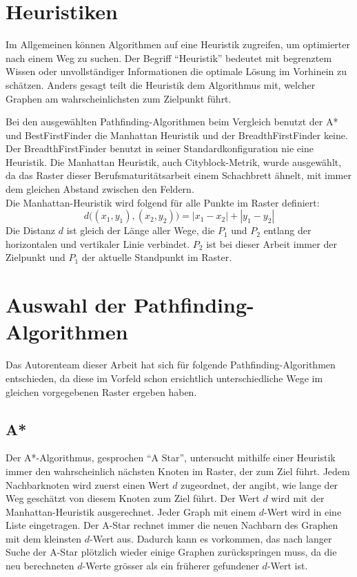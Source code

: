 
\section{Heuristiken}

Im Allgemeinen können Algorithmen auf eine Heuristik zugreifen, um
optimierter nach einem Weg zu suchen. Der Begriff ``Heuristik'' bedeutet
mit begrenztem Wissen oder unvollständiger Informationen die optimale
Lösung im Vorhinein zu schätzen. Anders gesagt teilt die Heuristik dem
Algorithmus mit, welcher Graphen am wahrscheinlichsten zum Zielpunkt führt.

Bei den ausgewählten Pathfinding-Algorithmen beim Vergleich benutzt der A* und
BestFirstFinder die Manhattan Heuristik und der BreadthFirstFinder
keine. Der BreadthFirstFinder benutzt in seiner Standardkonfiguration nie eine
Heuristik. Die Manhattan Heuristik, auch Cityblock-Metrik, wurde
ausgewählt, da das Raster dieser Berufsmaturitätsarbeit einem Schachbrett
ähnelt, mit immer dem gleichen Abstand zwischen den Feldern.\\
Die Manhattan-Heuristik wird folgend für alle Punkte im Raster definiert:
\begin{equation*}
d\big((x_1,y_1),(x_2,y_2)\big) = |x_1 - x_{2}| + |y_{1} - y_{2}|
\end{equation*}
Die Distanz $d$ ist gleich der Länge aller Wege, die $P_1$ und $P_2$ entlang der horizontalen und vertikaler Linie verbindet. $P_2$ ist bei dieser Arbeit immer der Zielpunkt und $P_1$ der
aktuelle Standpunkt im Raster. \cite[Patel, 2019]{heuristicsredblob}

\section{Auswahl der Pathfinding-Algorithmen}

Das Autorenteam dieser Arbeit hat sich für folgende Pathfinding-Algorithmen
entschieden, da diese im Vorfeld schon ersichtlich unterschiedliche
Wege im gleichen vorgegebenen Raster ergeben haben.

\subsection{A*}

Der A*-Algorithmus, gesprochen ``A Star'', untersucht mithilfe einer
Heuristik immer den wahrscheinlich nächsten Knoten im Raster, der zum
Ziel führt. Jedem Nachbarknoten wird zuerst einen Wert $d$ zugeordnet, der
angibt, wie lange der Weg geschätzt von diesem Knoten zum Ziel führt. Der Wert $d$
wird mit der Manhattan-Heuristik ausgerechnet. Jeder Graph mit einem $d$-Wert 
wird in eine Liste eingetragen. Der A-Star rechnet immer die neuen
Nachbarn des Graphen mit dem kleinsten $d$-Wert aus. Dadurch kann es
vorkommen, das nach langer Suche der A-Star plötzlich wieder einige
Graphen zurückspringen muss, da die neu berechneten $d$-Werte grösser als
ein früherer gefundener $d$-Wert ist.
\cite[Schmidt, Fuchs]{asterngeo}

